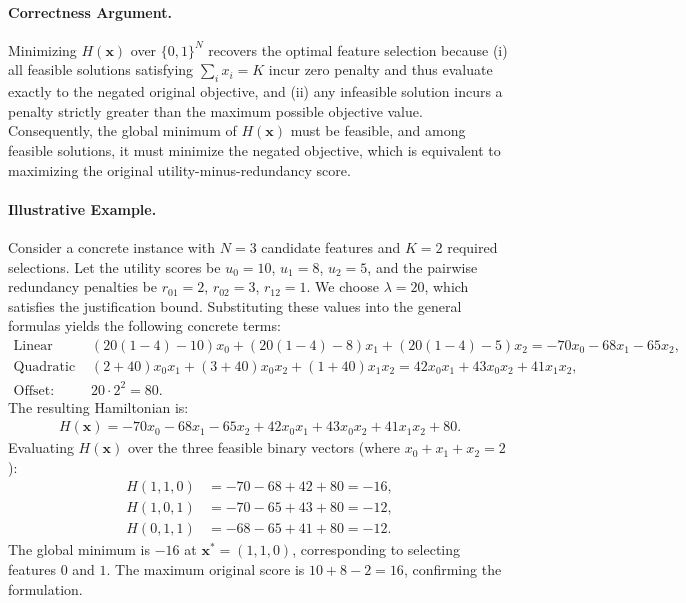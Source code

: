 \documentclass[12pt]{article}
\begin{document}
\paragraph{Correctness Argument.}
Minimizing $H(\mathbf{x})$ over $\{0,1\}^N$ recovers the optimal feature selection because (i) all feasible solutions satisfying $\sum_i x_i = K$ incur zero penalty and thus evaluate exactly to the negated original objective, and (ii) any infeasible solution incurs a penalty strictly greater than the maximum possible objective value. Consequently, the global minimum of $H(\mathbf{x})$ must be feasible, and among feasible solutions, it must minimize the negated objective, which is equivalent to maximizing the original utility-minus-redundancy score.

\paragraph{Illustrative Example.}
Consider a concrete instance with $N=3$ candidate features and $K=2$ required selections. Let the utility scores be $u_0=10$, $u_1=8$, $u_2=5$, and the pairwise redundancy penalties be $r_{01}=2$, $r_{02}=3$, $r_{12}=1$. We choose $\lambda=20$, which satisfies the justification bound. Substituting these values into the general formulas yields the following concrete terms:
\begin{align}
\text{Linear terms: } & (20(1-4)-10)x_0 + (20(1-4)-8)x_1 + (20(1-4)-5)x_2 = -70x_0 - 68x_1 - 65x_2, \\
\text{Quadratic terms: } & (2+40)x_0x_1 + (3+40)x_0x_2 + (1+40)x_1x_2 = 42x_0x_1 + 43x_0x_2 + 41x_1x_2, \\
\text{Offset: } & 20 \cdot 2^2 = 80.
\end{align}
The resulting Hamiltonian is:
\begin{align}
H(\mathbf{x}) = -70x_0 - 68x_1 - 65x_2 + 42x_0x_1 + 43x_0x_2 + 41x_1x_2 + 80.
\end{align}
Evaluating $H(\mathbf{x})$ over the three feasible binary vectors (where $x_0+x_1+x_2=2$):
\begin{align}
H(1,1,0) &= -70 - 68 + 42 + 80 = -16, \\
H(1,0,1) &= -70 - 65 + 43 + 80 = -12, \\
H(0,1,1) &= -68 - 65 + 41 + 80 = -12.
\end{align}
The global minimum is $-16$ at $\mathbf{x}^* = (1,1,0)$, corresponding to selecting features $0$ and $1$. The maximum original score is $10 + 8 - 2 = 16$, confirming the formulation.
\end{document}
